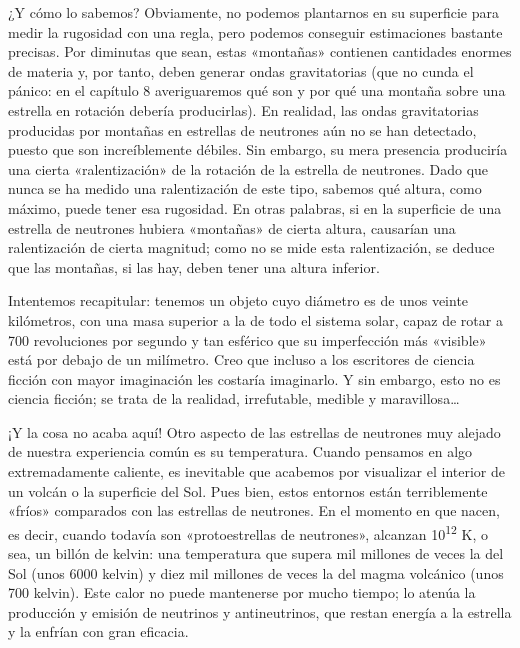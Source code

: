 ¿Y cómo lo sabemos? Obviamente, no podemos plantarnos en su superficie para medir la rugosidad con una regla, pero podemos conseguir estimaciones bastante precisas. Por diminutas que sean, estas «montañas» contienen cantidades enormes de materia y, por tanto, deben generar ondas gravitatorias (que no cunda el pánico: en el capítulo 8 averiguaremos qué son y por qué una montaña sobre una estrella en rotación debería producirlas). En realidad, las ondas gravitatorias producidas por montañas en estrellas de neutrones aún no se han detectado, puesto que son increíblemente débiles. Sin embargo, su mera presencia produciría una cierta «ralentización» de la rotación de la estrella de neutrones. Dado que nunca se ha medido una ralentización de este tipo, sabemos qué altura, como máximo, puede tener esa rugosidad. En otras palabras, si en la superficie de una estrella de neutrones hubiera «montañas» de cierta altura, causarían una ralentización de cierta magnitud; como no se mide esta ralentización, se deduce que las montañas, si las hay, deben tener una altura inferior.

Intentemos recapitular: tenemos un objeto cuyo diámetro es de unos veinte kilómetros, con una masa superior a la de todo el sistema solar, capaz de rotar a 700 revoluciones por segundo y tan esférico que su imperfección más «visible» está por debajo de un milímetro. Creo que incluso a los escritores de ciencia ficción con mayor imaginación les costaría imaginarlo. Y sin embargo, esto no es ciencia ficción; se trata de la realidad, irrefutable, medible y maravillosa…

¡Y la cosa no acaba aquí! Otro aspecto de las estrellas de neutrones muy alejado de nuestra experiencia común es su temperatura. Cuando pensamos en algo extremadamente caliente, es inevitable que acabemos por visualizar el interior de un volcán o la superficie del Sol. Pues bien, estos entornos están terriblemente «fríos» comparados con las estrellas de neutrones. En el momento en que nacen, es decir, cuando todavía son «protoestrellas de neutrones», alcanzan 10\textsuperscript{12} K, o sea, un billón de kelvin: una temperatura que supera mil millones de veces la del Sol (unos 6000 kelvin) y diez mil millones de veces la del magma volcánico (unos 700 kelvin). Este calor no puede mantenerse por mucho tiempo; lo atenúa la producción y emisión de neutrinos y antineutrinos, que restan energía a la estrella y la enfrían con gran eficacia.

